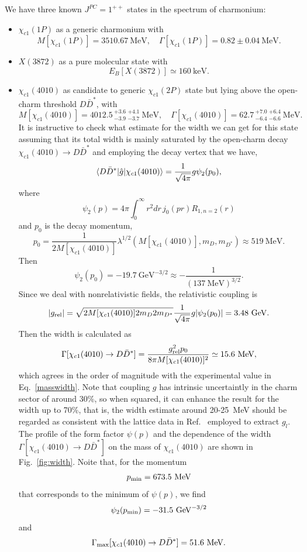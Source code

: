 \documentclass[aps,prl,showpacs,amsmath,onecolumn,superscriptaddress,floatfix,nofootinbib,notitlepage]{revtex4-2}
\newcommand{\GeV}{\mathrm{GeV}}
\newcommand{\be}{\begin{equation}}
\newcommand{\ee}{\end{equation}}
\newcommand{\X}{X(3872)}
\begin{document}
We have three known $J^{PC}=1^{++}$ states in the spectrum of charmonium:
\begin{itemize}
	\item $\chi_{c1}(1P)$ as a generic charmonium with
	      \be
	      M[\chi_{c1}(1P)]=3510.67~\mbox{MeV},\quad \Gamma[\chi_{c1}(1P)]=0.82\pm 0.04~\mbox{MeV}.
	      \ee
	\item $\X$ as a pure molecular state with
	      \be
	      E_B[\X]\simeq 160~\mbox{keV}.
	      \ee
	\item $\chi_{c1}(4010)$ as candidate to generic $\chi_{c1}(2P)$ state but lying above the open-charm threshold $D\bar{D}^*$, with \cite{LHCb:2024vfz}
	      \be
	      M[\chi_{c1}(4010)]=4012.5\,_{-3.9}^{+3.6}{}\,_{-3.7}^{+4.1}~\mbox{MeV},\quad \Gamma[\chi_{c1}(4010)]=62.7\,_{-6.4}^{+7.0}{}\,_{-6.6}^{+6.4}~\mbox{MeV}.
	      \label{masswidth}
	      \ee
	      It is instructive to check what estimate for the width we can get for this state assuming that its total width is mainly saturated by the open-charm decay $\chi_{c1}(4010)\to D\bar{D}^*$ and employing the decay vertex that we have,
	      \be
	      \braket{D\bar{D}^*|\hat{g}|\chi_{c1}(4010)}=\frac{1}{\sqrt{4\pi}}g\psi_2(p_0),
	      \label{psigMM}
	      \ee
	      where
	      \be
	      \psi_2(p)=
	      4\pi \int_0^\infty r^2dr\, j_0(pr)R_{1,n=2}(r)
	      \label{psinp}
	      \ee
	      and $p_0$ is the decay momentum,
	      \be
	      p_0=\frac{1}{2M[\chi_{c1}(4010)]}\lambda^{1/2}(M[\chi_{c1}(4010)],m_D,m_{D^*})\approx 519~\mbox{MeV}.
	      \ee
	      Then
	      \be
	      \psi_2(p_0) = -19.7~\GeV^{-3/2}\approx -\frac{1}{(137~\mbox{MeV})^{3/2}}.
	      \ee
	      Since we deal with nonrelativistic fields, the relativistic coupling is
	      \be
	      |g_{\rm rel}|=\sqrt{2M[\chi_{c1}(4010)]2m_D2m_{D^*}}\frac{1}{\sqrt{4\pi}}g|\psi_2(p_0)|= %
	      3.48~\GeV.
	      \ee
	      Then the width is calculated as
	      \be
	      \Gamma[\chi_{c1}(4010)\to D\bar{D}^*]=\frac{g_{\rm rel}^2 p_0}{8\pi M[\chi_{c1}(4010)]^2}\simeq %
	      15.6~\mbox{MeV},
	      \ee
	      which agrees in the order of magnitude with the experimental value in Eq.~\eqref{masswidth}. Note that coupling $g$ has intrinsic uncertaintly in the charm sector of around 30\%, so when squared, it can enhance the result for the width up to 70\%, that is, the width estimate around 20-25~MeV should be regarded as consistent with the lattice data in Ref.~\cite{Bulava:2024jpj} employed to extract $g_l$.
	      The profile of the form factor $\psi(p)$ and the dependence of the width $\Gamma[\chi_{c1}(4010)\to D\bar{D}^*]$ on the mass of $\chi_{c1}(4010)$ are shown in Fig.~\ref{fig:width}. Noite that, for the momentum
	      \be
	      p_{\rm min}=673.5~\mbox{MeV}
	      \ee
	      that corresponds to the minimum of $\psi(p)$, we find
	      \be
	      \psi_2(p_{\rm min})=-31.5~\GeV^{-3/2}
	      \ee
	      and
	      \be
	      \Gamma_{\rm max}[\chi_{c1}(4010)\to D\bar{D}^*]=51.6~\mbox{MeV}.
	      \label{width2}
	      \ee


\end{itemize}
\end{document}
